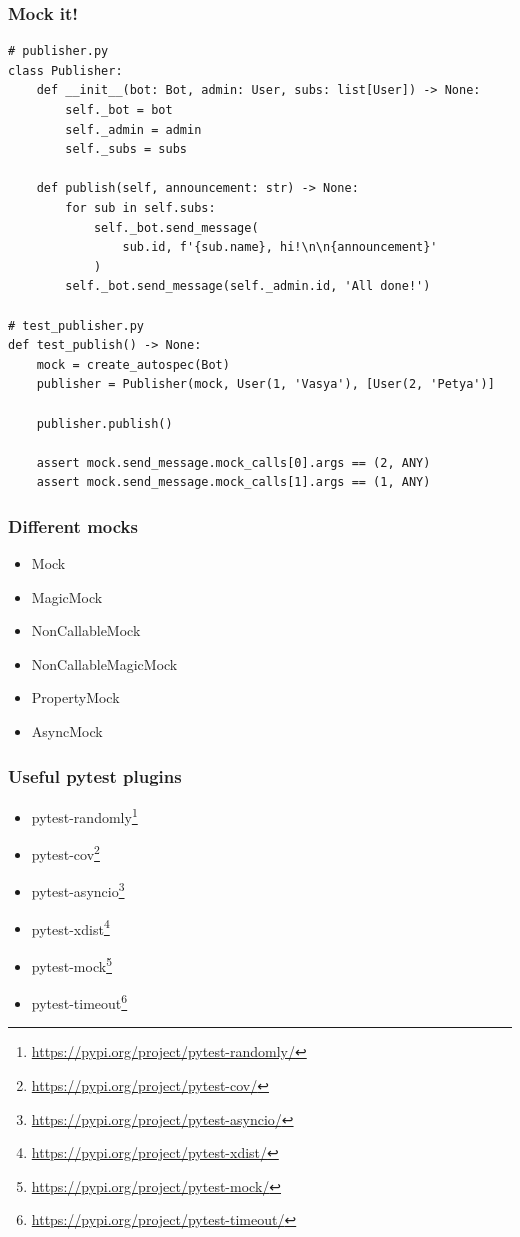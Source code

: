 \documentclass[compress]{beamer}
\begin{document}
\begin{frame}[fragile]
\frametitle{Mock it!}

\begin{center}
\begin{verbatim}
# publisher.py
class Publisher:
    def __init__(bot: Bot, admin: User, subs: list[User]) -> None:
        self._bot = bot
        self._admin = admin
        self._subs = subs

    def publish(self, announcement: str) -> None:
        for sub in self.subs:
            self._bot.send_message(
                sub.id, f'{sub.name}, hi!\n\n{announcement}'
            )
        self._bot.send_message(self._admin.id, 'All done!')

# test_publisher.py
def test_publish() -> None:
    mock = create_autospec(Bot)
    publisher = Publisher(mock, User(1, 'Vasya'), [User(2, 'Petya')]

    publisher.publish()

    assert mock.send_message.mock_calls[0].args == (2, ANY)
    assert mock.send_message.mock_calls[1].args == (1, ANY)
\end{verbatim}
\end{center}

\end{frame}


\begin{frame}[fragile]
\frametitle{Different mocks\footnotemark[1]}


\begin{itemize}
    \item Mock
    \item MagicMock
    \item NonCallableMock
    \item NonCallableMagicMock
    \item PropertyMock
    \item AsyncMock
\end{itemize}
\end{frame}


\begin{frame}[fragile]
\frametitle{Useful pytest plugins}

\begin{itemize}
    \item pytest-randomly\footnote[1]{\url{https://pypi.org/project/pytest-randomly/}}
    \item pytest-cov\footnote[2]{\url{https://pypi.org/project/pytest-cov/}}
    \item pytest-asyncio\footnote[3]{\url{https://pypi.org/project/pytest-asyncio/}}
    \item pytest-xdist\footnote[4]{\url{https://pypi.org/project/pytest-xdist/}}
    \item pytest-mock\footnote[5]{\url{https://pypi.org/project/pytest-mock/}}
    \item pytest-timeout\footnote[6]{\url{https://pypi.org/project/pytest-timeout/}}
\end{itemize}

\end{frame}
\end{document}
